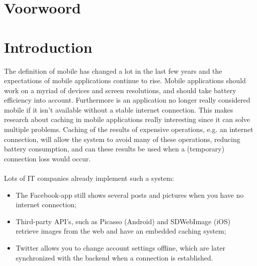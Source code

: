 \documentclass[pdftex,a4paper,12pt,twoside]{report}
\begin{document}
\begin{abstract}
  \lipsum[1-4]
\end{abstract}

\chapter*{Voorwoord}
\label{ch:voorwoord}

\lipsum[5-6]

\tableofcontents



\chapter{Introduction}
\label{ch:introduction}
The definition of mobile has changed a lot in the last few years and the expectations of mobile applications continue to rise.
Mobile applications should work on a myriad of devices and screen resolutions, and should take battery efficiency into account.
Furthermore is an application no longer really considered mobile if it isn't available without a stable internet connection.
This makes research about caching in mobile applications really interesting since it can solve multiple problems.
Caching of the results of expensive operations, e.g. an internet connection, will allow the system to avoid many of these operations,
reducing battery consumption, and can these results be used when a (temporary) connection loss would occur.
\\\\
Lots of IT companies already implement such a system:
\begin{itemize}
\item The Facebook-app still shows several posts and pictures when you have no internet connection;
\item Third-party API's, such as Picasso (Android) and SDWebImage (iOS) retrieve images from the web and have an embedded caching system;
\item Twitter allows you to change account settings offline, which are later synchronized with the backend when a connection is established\footnotemark.
\end{itemize}
\newpage
\end{document}
